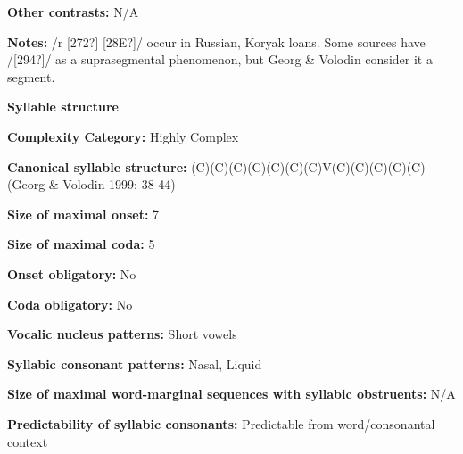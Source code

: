 \begin{styleBody}
\textbf{Other contrasts:} N/A
\end{styleBody}

\begin{styleBody}
\textbf{Notes:} /r [272?] [28E?]/ occur in Russian, Koryak loans. Some sources have /[294?]/ as a suprasegmental phenomenon, but Georg \& Volodin consider it a segment. 
\end{styleBody}

\begin{styleBody}
\textbf{Syllable structure}
\end{styleBody}

\begin{styleBody}
\textbf{Complexity Category:} Highly Complex
\end{styleBody}

\begin{styleBody}
\textbf{Canonical syllable structure:} (C)(C)(C)(C)(C)(C)(C)V(C)(C)(C)(C)(C)\textbf{ }(Georg \& Volodin 1999: 38-44)
\end{styleBody}

\begin{styleBody}
\textbf{Size of maximal onset:} 7
\end{styleBody}

\begin{styleBody}
\textbf{Size of maximal coda:} 5
\end{styleBody}

\begin{styleBody}
\textbf{Onset obligatory:} No
\end{styleBody}

\begin{styleBody}
\textbf{Coda obligatory:} No
\end{styleBody}

\begin{styleBody}
\textbf{Vocalic nucleus patterns:} Short vowels
\end{styleBody}

\begin{styleBody}
\textbf{Syllabic consonant patterns:} Nasal, Liquid
\end{styleBody}

\begin{styleBody}
\textbf{Size of maximal word{}-marginal sequences with syllabic obstruents:} N/A
\end{styleBody}

\begin{styleBody}
\textbf{Predictability of syllabic consonants:} Predictable from word/consonantal context
\end{styleBody}

